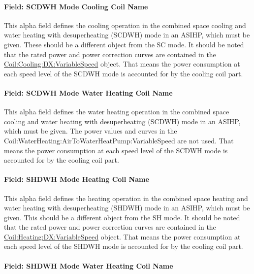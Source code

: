 \paragraph{Field: SCDWH Mode Cooling Coil Name}\label{Field-SCDWH-Mode-Cooling-Coil-Name-ASIHP}

This alpha field defines the cooling operation in the combined space cooling and water heating with desuperheating (SCDWH) mode in an ASIHP, which must be given. These should be a different object from the SC mode. It should be noted that the rated power and power correction curves are contained in the \hyperref[coilcoolingdxvariablespeed]{Coil:Cooling:DX:VariableSpeed} object. That means the power consumption at each speed level of the SCDWH mode is accounted for by the cooling coil part.

\paragraph{Field: SCDWH Mode Water Heating Coil Name}\label{Field-SCDWH-Mode-Water-Heating-Coil-Name-ASIHP}

This alpha field defines the water heating operation in the combined space cooling and water heating with desuperheating (SCDWH) mode in an ASIHP, which must be given. The power values and curves in the Coil:WaterHeating:AirToWaterHeatPump:VariableSpeed are not used. That means the power consumption at each speed level of the SCDWH mode is accounted for by the cooling coil part.

\paragraph{Field: SHDWH Mode Heating Coil Name}\label{Field-SHDWH-Mode-Heating-Coil-Name-ASIHP}

This alpha field defines the heating operation in the combined space heating and water heating with desuperheating (SHDWH) mode in an ASIHP, which must be given. This should be a different object from the SH mode. It should be noted that the rated power and power correction curves are contained in the \hyperref[coilheatingdxvariablespeed]{Coil:Heating:DX:VariableSpeed} object. That means the power consumption at each speed level of the SHDWH mode is accounted for by the cooling coil part.

\paragraph{Field: SHDWH Mode Water Heating Coil Name}\label{Field-SHDWH-Mode-Water-Heating-Coil-Name-ASIHP}

